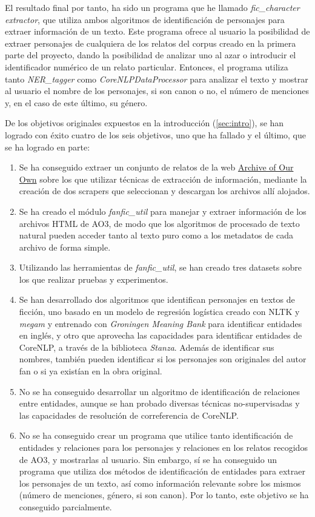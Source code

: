 \documentclass{pre-tfg}
\begin{document}
El resultado final por tanto, ha sido un programa que he llamado \textit{fic\_character extractor}, que utiliza ambos algoritmos de identificación de personajes para extraer información de un texto. Este programa ofrece al usuario la posibilidad de extraer personajes de cualquiera de los relatos del corpus creado en la primera parte del proyecto, dando la posibilidad de analizar uno al azar o introducir el identificador numérico de un relato particular. Entonces, el programa utiliza tanto \textit{NER\_tagger} como \textit{CoreNLPDataProcessor} para analizar el texto y mostrar al usuario el nombre de los personajes, si son canon o no, el número de menciones y, en el caso de este último, su género.

 De los objetivos originales expuestos en la introducción (\ref{sec:intro}), se han logrado con éxito cuatro de los seis objetivos, uno que ha fallado y el último, que se ha logrado en parte:
\begin{enumerate}
	\item Se ha conseguido extraer un conjunto de relatos de la web \href{http://wwww.archiveofourown.org}{Archive of Our Own} sobre los que utilizar técnicas de extracción de información, mediante la creación de dos scrapers que seleccionan y descargan los archivos allí alojados.
	\item Se ha creado el módulo \textit{fanfic\_util} para manejar y extraer información de los archivos HTML de AO3, de modo que los algoritmos de procesado de texto natural pueden acceder tanto al texto puro como a los metadatos de cada archivo de forma simple. 
	\item Utilizando las herramientas de \textit{fanfic\_util}, se han creado tres datasets sobre los que realizar pruebas y experimentos.
	\item Se han desarrollado dos algoritmos que identifican personajes en textos de ficción, uno basado en un modelo de regresión logística creado con NLTK y \textit{megam} y entrenado con \textit{Groningen Meaning Bank} para identificar entidades en inglés, y otro que aprovecha las capacidades para identificar entidades de CoreNLP, a través de la biblioteca \textit{Stanza}. Además de identificar sus nombres, también pueden identificar si los personajes son originales del autor fan o si ya existían en la obra original.
	\item No se ha conseguido desarrollar un algoritmo de identificación de relaciones entre entidades, aunque se han probado diversas técnicas no-supervisadas y las capacidades de resolución de correferencia de CoreNLP.
	\item No se ha conseguido crear un programa que utilice tanto identificación de entidades y relaciones para los personajes y relaciones en los relatos recogidos de AO3, y mostrarlas al usuario. Sin embargo, sí se ha conseguido un programa que utiliza dos métodos de identificación de entidades para extraer los personajes de un texto, así como información relevante sobre los mismos (número de menciones, género, si son canon). Por lo tanto, este objetivo se ha conseguido parcialmente.

\end{enumerate}
\end{document}
